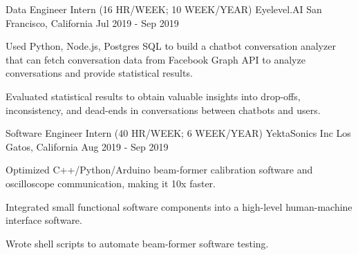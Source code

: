 

\begin{cventries}

  \cventry
    {Data Engineer Intern (16 HR/WEEK; 10 WEEK/YEAR)} %
    {Eyelevel.AI} %
    {San Francisco, California} %
    {Jul 2019 - Sep 2019} %
    {
	\begin{cvitems} %
      	\item Used Python, Node.js, Postgres SQL to build a chatbot conversation analyzer that can fetch conversation data from Facebook Graph API to analyze conversations and provide statistical results.
      	\item Evaluated statistical results to obtain valuable insights into drop-offs, inconsistency, and dead-ends in conversations between chatbots and users.
	\end{cvitems}
    }
    
  \cventry
    {Software Engineer Intern (40 HR/WEEK; 6 WEEK/YEAR)} %
    {YektaSonics Inc} %
    {Los Gatos, California} %
    {Aug 2019 - Sep 2019} %
    {
	\begin{cvitems} %
      	\item Optimized C++/Python/Arduino beam-former calibration software and oscilloscope communication, making it 10x faster.
      	\item Integrated small functional software components into a high-level human-machine interface software. 
      	\item Wrote shell scripts to automate beam-former software testing.
	\end{cvitems}
    }
    

\end{cventries}
